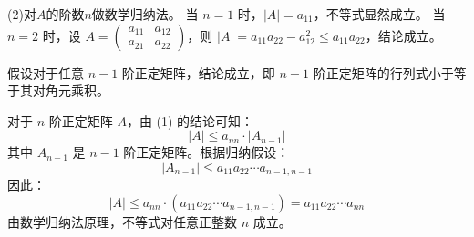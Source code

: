 \begin{solution}
(2)对$A$的阶数$n$做数学归纳法。
当 $n=1$ 时，$|A| = a_{11}$，不等式显然成立。
当 $n=2$ 时，设 $A = \begin{pmatrix} a_{11} & a_{12} \\ a_{21} & a_{22} \end{pmatrix}$，则 $|A| = a_{11}a_{22} - a_{12}^2 \le a_{11}a_{22}$，结论成立。

假设对于任意 $n-1$ 阶正定矩阵，结论成立，即 $n-1$ 阶正定矩阵的行列式小于等于其对角元乘积。

对于 $n$ 阶正定矩阵 $A$，由 (1) 的结论可知：
\[
|A| \le a_{nn} \cdot |A_{n-1}|
\]
其中 $A_{n-1}$ 是 $n-1$ 阶正定矩阵。根据归纳假设：
\[
|A_{n-1}| \le a_{11}a_{22}\cdots a_{n-1,n-1}
\]
因此：
\[
|A| \le a_{nn} \cdot (a_{11}a_{22}\cdots a_{n-1,n-1}) = a_{11}a_{22}\cdots a_{nn}
\]
由数学归纳法原理，不等式对任意正整数 $n$ 成立。
\end{solution}

